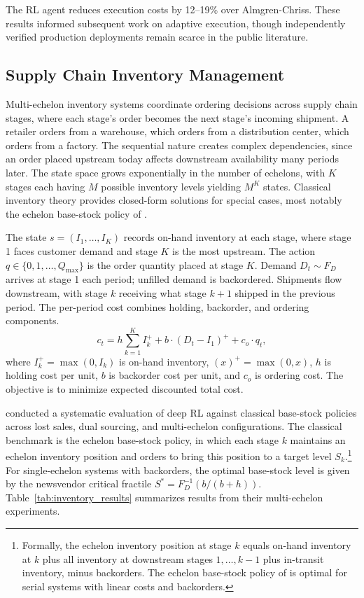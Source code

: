 The RL agent reduces execution costs by 12--19\% over Almgren-Chriss. These results informed subsequent work on adaptive execution, though independently verified production deployments remain scarce in the public literature.


\subsection{Supply Chain Inventory Management}
\label{sec:inventory}

Multi-echelon inventory systems coordinate ordering decisions across supply chain stages, where each stage's order becomes the next stage's incoming shipment. A retailer orders from a warehouse, which orders from a distribution center, which orders from a factory. The sequential nature creates complex dependencies, since an order placed upstream today affects downstream availability many periods later. The state space grows exponentially in the number of echelons, with $K$ stages each having $M$ possible inventory levels yielding $M^K$ states. Classical inventory theory provides closed-form solutions for special cases, most notably the echelon base-stock policy of \citet{ClarkScarf1960inventory}.

The state $s = (I_1, \ldots, I_K)$ records on-hand inventory at each stage, where stage 1 faces customer demand and stage $K$ is the most upstream. The action $q \in \{0, 1, \ldots, Q_{\max}\}$ is the order quantity placed at stage $K$. Demand $D_t \sim F_D$ arrives at stage 1 each period; unfilled demand is backordered. Shipments flow downstream, with stage $k$ receiving what stage $k+1$ shipped in the previous period. The per-period cost combines holding, backorder, and ordering components.
\begin{equation}
c_t = h \sum_{k=1}^{K} I_k^+ + b \cdot (D_t - I_1)^+ + c_o \cdot q_t,
\end{equation}
where $I_k^+ = \max(0, I_k)$ is on-hand inventory, $(x)^+ = \max(0, x)$, $h$ is holding cost per unit, $b$ is backorder cost per unit, and $c_o$ is ordering cost. The objective is to minimize expected discounted total cost.

\citet{Gijsbrechts2022inventory} conducted a systematic evaluation of deep RL against classical base-stock policies across lost sales, dual sourcing, and multi-echelon configurations. The classical benchmark is the echelon base-stock policy, in which each stage $k$ maintains an echelon inventory position and orders to bring this position to a target level $S_k$.\footnote{Formally, the echelon inventory position at stage $k$ equals on-hand inventory at $k$ plus all inventory at downstream stages $1, \ldots, k-1$ plus in-transit inventory, minus backorders. The echelon base-stock policy of \citet{ClarkScarf1960inventory} is optimal for serial systems with linear costs and backorders.} For single-echelon systems with backorders, the optimal base-stock level is given by the newsvendor critical fractile $S^* = F_D^{-1}(b/(b+h))$. Table~\ref{tab:inventory_results} summarizes results from their multi-echelon experiments.

